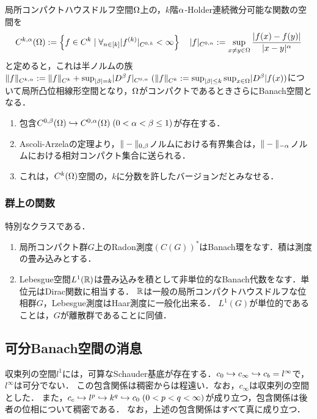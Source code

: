 \documentclass[uplatex,dvipdfmx]{jsreport}
\begin{document}
\begin{example}[Holder空間]
    局所コンパクトハウスドルフ空間$\Omega$上の，$k$階$\alpha$-Holder連続微分可能な関数の空間を
    \[C^{k,\alpha}(\Omega):=\left\{f\in C^k\mid\forall_{n\in[k]}\lvert f^{(k)}\rvert_{C^{0,k}}<\infty\right\}\quad\lvert f\rvert_{C^{0,\alpha}}:=\sup_{x\ne y\in\Omega}\frac{\lvert f(x)-f(y)\rvert}{\lvert x-y\rvert^\alpha}\]
    と定めると，これは半ノルムの族$\|f\|_{C^{k,\alpha}}:=\|f\|_{C^k}+\sup_{\lvert\beta\rvert=k}\lvert D^\beta f\rvert_{C^{0,\alpha}}\;(\|f\|_{C^k}:=\sup_{\lvert\beta\rvert\le k}\sup_{x\in\Omega}\lvert D^\beta\rvert f(x))$について局所凸位相線形空間となり，$\Omega$がコンパクトであるときさらにBanach空間となる．
    \begin{enumerate}
        \item 包含$C^{0,\beta}(\Omega)\hookrightarrow C^{0,\alpha}(\Omega)\;(0<\alpha<\beta\le 1)$が存在する．
        \item Ascoli-Arzelaの定理より，$\|-\|_{0,\beta}$ノルムにおける有界集合は，$\|-\|_{-\alpha}$ノルムにおける相対コンパクト集合に送られる．
        \item これは，$C^k(\Omega)$空間の，$k$に分数を許したバージョンだとみなせる．
    \end{enumerate}
\end{example}

\subsubsection{群上の関数}

\begin{example}
    特別なクラスである．
    \begin{enumerate}
        \item 局所コンパクト群$G$上のRadon測度$(C(G))^*$はBanach環をなす．積は測度の畳み込みとする．
        \item Lebesgue空間$L^1(\mathbb{R})$は畳み込みを積として非単位的なBanach代数をなす．単位元はDirac関数に相当する．
        $\mathbb{R}$は一般の局所コンパクトハウスドルフな位相群$G$，Lebesgue測度はHaar測度に一般化出来る．
        $L^1(G)$が単位的であることは，$G$が離散群であることに同値．
    \end{enumerate}
\end{example}

\subsection{可分Banach空間の消息}

\begin{tcolorbox}[colframe=ForestGreen, colback=ForestGreen!10!white,breakable,colbacktitle=ForestGreen!40!white,coltitle=black,fonttitle=\bfseries\sffamily,
title=]
    収束列の空間$l^1$には，可算なSchauder基底が存在する．$c_0\hookrightarrow c_\infty\hookrightarrow c_b=l^\infty$で，$l^\infty$は可分でない．
    この包含関係は稠密からは程遠い．なお，$c_\infty$は収束列の空間とした．
    また，$c_c\hookrightarrow l^p\hookrightarrow k^q\hookrightarrow c_0\;(0<p<q<\infty)$が成り立つ，包含関係は後者の位相について稠密である．
    なお，上述の包含関係はすべて真に成り立つ．
\end{tcolorbox}
\end{document}
